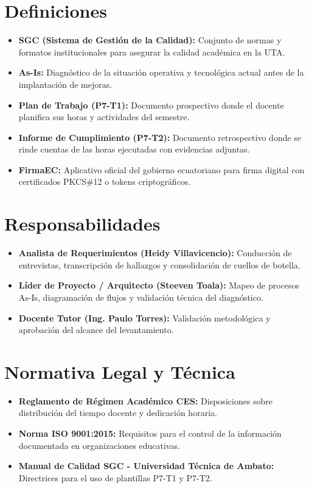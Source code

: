 \documentclass[12pt,a4paper]{article}
\begin{document}
\section{Definiciones}
\begin{itemize}[leftmargin=1.5em, itemsep=2pt]
    \item \textbf{SGC (Sistema de Gestión de la Calidad):} Conjunto de normas y formatos institucionales para asegurar la calidad académica en la UTA.
    \item \textbf{As-Is:} Diagnóstico de la situación operativa y tecnológica actual antes de la implantación de mejoras.
    \item \textbf{Plan de Trabajo (P7-T1):} Documento prospectivo donde el docente planifica sus horas y actividades del semestre.
    \item \textbf{Informe de Cumplimiento (P7-T2):} Documento retrospectivo donde se rinde cuentas de las horas ejecutadas con evidencias adjuntas.
    \item \textbf{FirmaEC:} Aplicativo oficial del gobierno ecuatoriano para firma digital con certificados PKCS\#12 o tokens criptográficos.
\end{itemize}

\section{Responsabilidades}
\begin{itemize}[leftmargin=1.5em, itemsep=2pt]
    \item \textbf{Analista de Requerimientos (Heidy Villavicencio):} Conducción de entrevistas, transcripción de hallazgos y consolidación de cuellos de botella.
    \item \textbf{Líder de Proyecto / Arquitecto (Steeven Toala):} Mapeo de procesos As-Is, diagramación de flujos y validación técnica del diagnóstico.
    \item \textbf{Docente Tutor (Ing. Paulo Torres):} Validación metodológica y aprobación del alcance del levantamiento.
\end{itemize}

\section{Normativa Legal y Técnica}
\begin{itemize}[leftmargin=1.5em, itemsep=2pt]
    \item \textbf{Reglamento de Régimen Académico CES:} Disposiciones sobre distribución del tiempo docente y dedicación horaria.
    \item \textbf{Norma ISO 9001:2015:} Requisitos para el control de la información documentada en organizaciones educativas.
    \item \textbf{Manual de Calidad SGC - Universidad Técnica de Ambato:} Directrices para el uso de plantillas P7-T1 y P7-T2.
\end{itemize}
\end{document}
